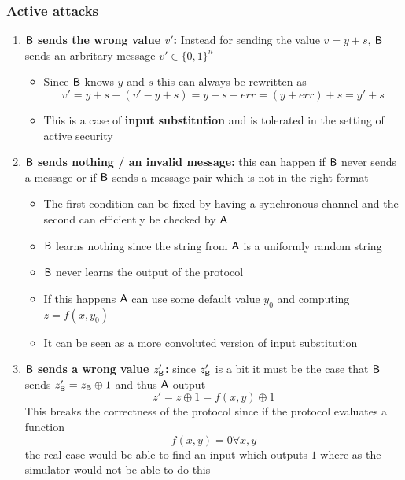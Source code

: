 \subsubsection{Active attacks}
\begin{enumerate}
    \item \textbf{$\mathsf{B}$ sends the wrong value $v'$:} Instead for sending the value $v = y + s$, $\mathsf{B}$ sends an arbritary message $v' \in \{0,1\}^n$
    \begin{itemize}
        \item Since $\mathsf{B}$ knows $y$ and $s$ this can always be rewritten as 
        \begin{equation*}
            v' = y + s + (v' - y + s) = y + s + err = (y + err) + s = y' +s
        \end{equation*}
        \item This is a case of \textbf{input substitution} and is tolerated in the setting of active security
    \end{itemize}
    \item \textbf{$\mathsf{B}$ sends nothing / an invalid message:} this can happen if $\mathsf{B}$ never sends a message or if $\mathsf{B}$ sends a message pair which is not in the right format 
    \begin{itemize}
        \item The first condition can be fixed by having a synchronous channel and the second can efficiently be checked by $\mathsf{A}$
        \item $\mathsf{B}$ learns nothing since the string from $\mathsf{A}$ is a uniformly random string
        \item $\mathsf{B}$ never learns the output of the protocol
        \item If this happens $\mathsf{A}$ can use some default value $y_0$ and computing $z = f(x, y_0)$
        \item It can be seen as a more convoluted version of input substitution
    \end{itemize}
    \item \textbf{$\mathsf{B}$ sends a wrong value $z_{\mathsf{B}}'$:} since $z_{\mathsf{B}}'$ is a bit it must be the case that $\mathsf{B}$ sends $z_{\mathsf{B}}' = z_{\mathsf{B}} \oplus 1$ and thus $\mathsf{A}$ output
    \begin{equation*}
        z' = z \oplus 1 = f(x,y) \oplus 1
    \end{equation*}
    This breaks the correctness of the protocol since if the protocol evaluates a function
    \begin{equation*}
        f(x,y) = 0 \forall x,y
    \end{equation*}
    the real case would be able to find an input which outputs $1$ where as the simulator would not be able to do this
\end{enumerate}    

